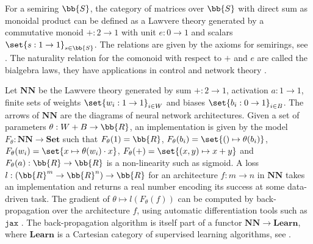 \begin{example}
For a semiring $\bb{S}$, the category of matrices over $\bb{S}$ with direct sum as monoidal product can be defined as a Lawvere theory generated by a commutative monoid $+ : 2 \to 1$ with unit $e : 0 \to 1$ and scalars $\set{s : 1 \to 1}_{s \in \bb{S}}$.
The relations are given by the axioms for semirings, see \cite{WadsleyWoods15}.
The naturality relation for the comonoid with respect to $+$ and $e$ are called the bialgebra laws, they have applications in control and network theory \cite{BaezErbele14,BaezEtAl18}.
\end{example}

\begin{example}
Let $\mathbf{NN}$ be the Lawvere
theory generated by sum $+ : 2 \to 1$, activation $a : 1 \to 1$,
finite sets of weights $\set{w_i : 1 \to 1}_{i \in W}$ and biases
$\set{b_i : 0 \to 1}_{i \in B}$. The arrows of $\mathbf{NN}$ are the diagrams
of neural network architectures.
Given a set of parameters $\theta : W + B \to \bb{R}$, an implementation is
given by the model $F_\theta : \mathbf{NN} \to \mathbf{Set}$ such that
$F_\theta(1) = \bb{R}$,
$F_\theta(b_i) = \set{() \mapsto \theta(b_i)}$,
$F_\theta(w_i) = \set{x \mapsto \theta(w_i) \cdot x}$,
$F_\theta(+) = \set{(x, y) \mapsto x + y}$
and $F_\theta(a) : \bb{R} \to \bb{R}$ is a non-linearity such as sigmoid.
A loss $l : (\bb{R}^m \to \bb{R}^n) \to \bb{R}$ for an architecture $f : m \to n$ in $\mathbf{NN}$ takes an implementation and
returns a real number encoding its success at some data-driven task.
The gradient of $\theta \mapsto l(F_\theta(f))$ can be computed by
back-propagation over the architecture $f$, using automatic differentiation tools such as $\mathtt{jax}$ \cite{Google/jax20}. The back-propagation algorithm is
itself part of a functor $\mathbf{NN} \to \mathbf{Learn}$, where $\mathbf{Learn}$ is a
Cartesian category of supervised learning algorithms, see \cite{FongEtAl17, FongJohnson19}.
\end{example}
